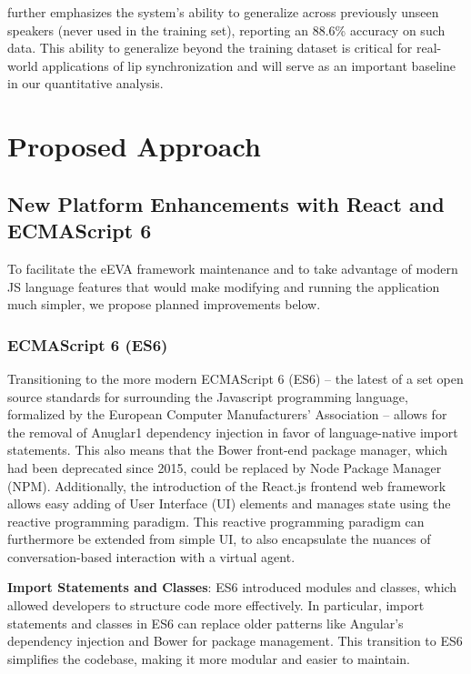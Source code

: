 \documentclass[12pt]{article}
\begin{document}
\cite{AssaelLIPNET:LIPREADING} further emphasizes the system's ability to generalize across previously unseen speakers (never used in the training set), reporting an 88.6\% accuracy on such data. This ability to generalize beyond the training dataset is critical for real-world applications of lip synchronization and will serve as an important baseline in our quantitative analysis.


\section{Proposed Approach}
\label{sec:approach}

\subsection{New Platform Enhancements with React and ECMAScript 6}

To facilitate the eEVA framework maintenance  and to take advantage of modern JS language features that would make modifying and running the application much simpler, we propose planned improvements below. 

\subsubsection{ECMAScript 6 (ES6)}

Transitioning to the more modern ECMAScript 6 (ES6) -- the latest of a set open source standards for surrounding the Javascript programming language, formalized by the European Computer Manufacturers' Association\cite{ECMA-262International} -- allows for the removal of Anuglar1 dependency injection in favor of language-native import statements\cite{ECMA-262International}\cite{JavaScriptMDN}\cite{ExploringES6}. This also means that the Bower front-end package manager, which had been deprecated since 2015, could be replaced by Node Package Manager (NPM). Additionally, the introduction of the React.js frontend web framework allows easy adding of User Interface (UI) elements and manages state using the reactive programming paradigm. This reactive programming paradigm can  furthermore be extended from simple UI, to also encapsulate the nuances of conversation-based interaction with a virtual agent.

\textbf{Import Statements and Classes}: ES6 introduced modules and classes, which allowed developers to structure code more effectively. In particular, import statements and classes in ES6 can replace older patterns like Angular’s dependency injection and Bower for package management. This transition to ES6 simplifies the codebase, making it more modular and easier to maintain.
\end{document}
